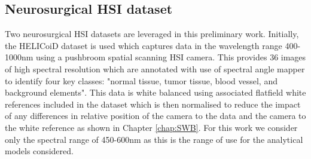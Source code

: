 \subsection{Neurosurgical HSI dataset}\label{sec:NeuroHSIdata}
Two neurosurgical HSI datasets are leveraged in this preliminary work. Initially, the HELICoiD dataset is used which captures data in the wavelength range 400-1000nm using a pushbroom spatial scanning HSI camera\cite{Fabelo2019}. This provides 36 images of high spectral resolution which are annotated with use of spectral angle mapper to identify four key classes: "normal tissue, tumor tissue, blood vessel, and background elements". This data is white balanced using associated flatfield white references included in the dataset which is then normalised to reduce the impact of any differences in relative position of the camera to the data and the camera to the white reference as shown in Chapter \ref{chap:SWB}. For this work we consider only the spectral range of 450-600nm as this is the range of use for the analytical models considered. 

